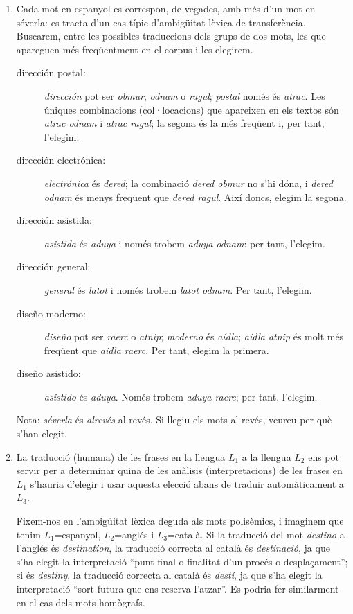 \begin{enumerate}
    \item Cada mot en espanyol es correspon, de vegades, amb més d'un
      mot en séverla: es tracta d'un cas típic d'ambigüitat lèxica de
      transferència. Buscarem, entre les possibles traduccions dels
      grups de dos mots, les que apareguen més freqüentment en el
      corpus i les elegirem.
      \begin{description}
      \item[dirección postal:] \emph{dirección} pot ser \emph{obmur},
        \emph{odnam} o \emph{ragul}; \emph{postal} només és
        \emph{atrac}. Les úniques combinacions (col·locacions) que
        apareixen en els textos són \emph{atrac odnam} i \emph{atrac
          ragul}; la segona és la més freqüent i, per tant, l'elegim.
      \item[dirección electrónica:] \emph{electrónica} és
        \emph{dered}; la combinació \emph{dered obmur} no s'hi dóna, i
        \emph{dered odnam} és menys freqüent que \emph{dered
          ragul}. Així doncs, elegim la segona.
      \item[dirección asistida:] \emph{asistida} és \emph{aduya} i
        només trobem \emph{aduya odnam}: per tant, l'elegim.
      \item[dirección general:] \emph{general} és \emph{latot} i només
        trobem \emph{latot odnam}. Per tant, l'elegim.
      \item[diseño moderno:] \emph{diseño} pot ser \emph{raerc} o
        \emph{atnip}; \emph{moderno} és \emph{aídla}; \emph{aídla
          atnip} és molt més freqüent que \emph{aídla raerc}. Per
        tant, elegim la primera.
      \item[diseño asistido:] \emph{asistido} és \emph{aduya}. Només
        trobem \emph{aduya raerc}; per tant, l'elegim.
      \end{description}
      Nota: \emph{séverla} és \emph{alrevés} al revés. Si llegiu els
      mots al revés, veureu per què s'han elegit.


    \item La traducció (humana) de les frases en la llengua $L_1$ a la
      llengua $L_2$ ens pot servir per a determinar quina de les
      anàlisis (interpretacions) de les frases en $L_1$ s'hauria
      d'elegir i usar aquesta elecció abans de traduir automàticament
      a $L_3$.
      
      Fixem-nos en l'ambigüitat lèxica deguda als mots polisèmics, i
      imaginem que tenim $L_1$=espanyol, $L_2$=anglés i $L_3$=català.
      Si la traducció del mot \emph{destino} a l'anglés és
      \emph{destination}, la traducció correcta al català és
      \emph{destinació}, ja que s'ha elegit la interpretació ``punt
      final o finalitat d'un procés o desplaçament''; si és
      \emph{destiny}, la traducció correcta al català és \emph{destí},
      ja que s'ha elegit la interpretació ``sort futura que ens
      reserva l'atzar''. Es podria fer similarment en el cas dels mots
      homògrafs.
      

\end{enumerate}
